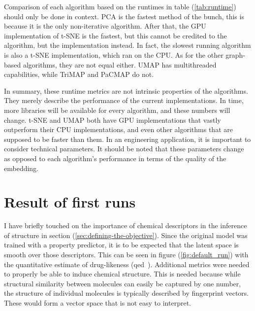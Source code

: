 Comparison of each algorithm based on the runtimes in table (\ref{tab:runtime}) should only be done in context. PCA is the fastest method of the bunch, this is because it is the only non-iterative algorithm. After that, the GPU implementation of t-SNE is the fastest, but this cannot be credited to the algorithm, but the implementation instead. In fact, the slowest running algorithm is also a t-SNE implementation, which ran on the CPU. As for the other graph-based algorithms, they are not equal either. UMAP has multithreaded capabilities, while TriMAP and PaCMAP do not.

In summary, these runtime metrics are not intrinsic properties of the algorithms. They merely describe the performance of the current implementations. In time, more libraries will be available for every algorithm, and these numbers will change. t-SNE and UMAP both have GPU implementations that vastly outperform their CPU implementations, and even other algorithms that are supposed to be faster than them. In an engineering application, it is important to consider technical parameters. It should be noted that these parameters change as opposed to each algorithm's performance in terms of the quality of the embedding.

\section{Result of first runs}\label{sec:result-of-first-runs}

I have briefly touched on the importance of chemical descriptors in the inference of structure in section (\ref{sec:defining-the-objective}). Since the original model was trained with a property predictor, it is to be expected that the latent space is smooth over those descriptors. This can be seen in figure (\ref{fig:default_run}) with the quantitative estimate of drug-likeness (qed~\cite{bib:qed}). Additional metrics were needed to properly be able to induce chemical structure. This is needed because while structural similarity between molecules can easily be captured by one number, the structure of individual molecules is typically described by fingerprint vectors. These would form a vector space that is not easy to interpret.

